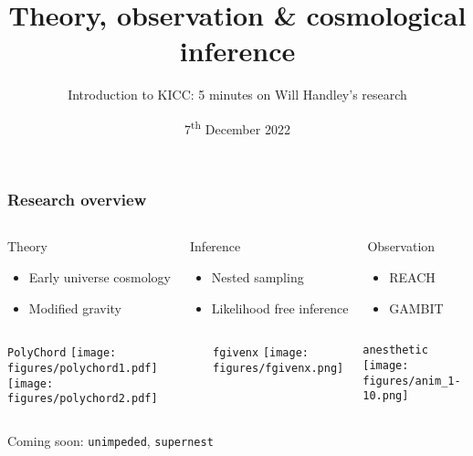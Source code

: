 \documentclass[aspectratio=169]{beamer}
\title{Theory, observation \& cosmological inference}
\subtitle{Introduction to KICC: 5 minutes on Will Handley's research}
\date{7\textsuperscript{th} December 2022}
\begin{document}
\begin{frame}
    \titlepage
\end{frame}

\begin{frame}
    \frametitle{Research overview}
    \begin{columns}
        \begin{block}{Theory}
            \begin{itemize}
                \item Early universe cosmology
                \item Modified gravity
            \end{itemize}
        \end{block}
        \begin{block}{Inference}
            \begin{itemize}
                \item Nested sampling
                \item Likelihood free inference
            \end{itemize}
        \end{block}
        \begin{block}{Observation}
            \begin{itemize}
                \item REACH
                \item GAMBIT
            \end{itemize}
        \end{block}
    \end{columns}
    
    \begin{columns}[t]
        \begin{block}{\texttt{PolyChord}}
            \texttt{[image: figures/polychord1.pdf]}
            \texttt{[image: figures/polychord2.pdf]}
        \end{block}
        
        \begin{block}{\texttt{fgivenx}}
            \texttt{[image: figures/fgivenx.png]}
        \end{block}

        \begin{block}{\texttt{anesthetic}}
            \texttt{[image: figures/anim\_1-10.png]}
        \end{block}
    \end{columns}



    \hfill Coming soon: \texttt{unimpeded}, \texttt{supernest}
\end{frame}
\end{document}
